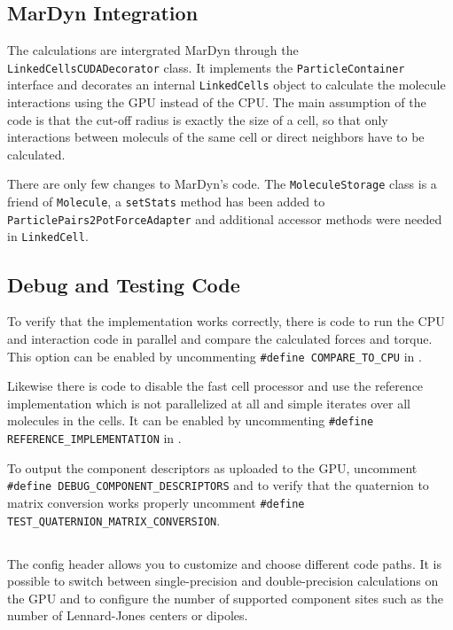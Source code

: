\subsection{MarDyn Integration}
The \cuda{} calculations are intergrated MarDyn through the \lstinline!LinkedCellsCUDADecorator! class. It implements the \lstinline!ParticleContainer! interface and decorates an internal \lstinline!LinkedCells! object to calculate the molecule interactions using the GPU instead of the CPU.
The main assumption of the code is that the cut-off radius is exactly the size of a cell, so that only interactions between moleculs of the same cell or direct neighbors have to be calculated.

There are only few changes to MarDyn's code. The \lstinline!MoleculeStorage! class is a friend of \lstinline!Molecule!, a \lstinline!setStats! method has been added to \lstinline!ParticlePairs2PotForceAdapter! and additional accessor methods were needed in \lstinline!LinkedCell!.

\subsection{Debug and Testing Code}
To verify that the \cuda{} implementation works correctly, there is code to run the CPU and \cuda{} interaction code in parallel and compare the calculated forces and torque.
This option can be enabled by uncommenting \lstinline!#define COMPARE_TO_CPU! in .

Likewise there is code to disable the fast cell processor and use the reference implementation which is not parallelized at all and simple iterates over all molecules in the cells.
It can be enabled by uncommenting \lstinline!#define REFERENCE_IMPLEMENTATION! in .

To output the component descriptors as uploaded to the GPU, uncomment \lstinline!#define DEBUG_COMPONENT_DESCRIPTORS! and to verify that the quaternion to matrix conversion works properly uncomment \lstinline!#define TEST_QUATERNION_MATRIX_CONVERSION!.

\subsection{}
The config header allows you to customize and choose different code paths. It is possible to switch between single-precision and double-precision calculations on the GPU and to configure the number of supported component sites such as the number of Lennard-Jones centers or dipoles.


